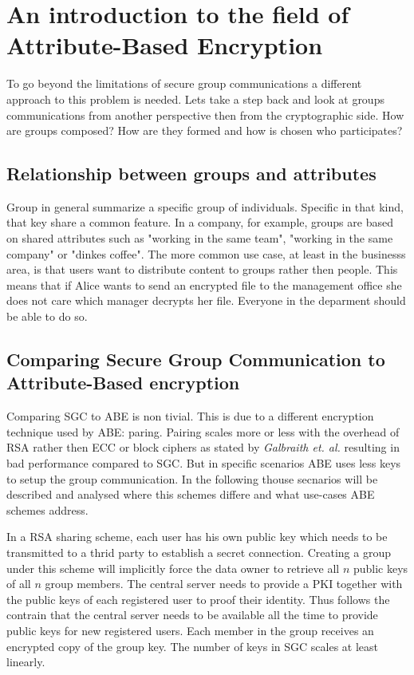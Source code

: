 \section{An introduction to the field of Attribute-Based Encryption}
To go beyond the limitations of secure group communications a different approach to this problem is needed. Lets take a step back and look at groups communications from another perspective then from the cryptographic side. How are groups composed? How are they formed and how is chosen who participates? 

\subsection{Relationship between groups and attributes}
Group in general summarize a specific group of individuals. Specific in that kind, that key share a common feature. In a company, for example, groups are based on shared attributes such as "working in the same team", "working in the same company" or "dinkes coffee". The more common use case, at least in the businesss area, is that users want to distribute content to groups rather then people. This means that if Alice wants to send an encrypted file to the management office she does not care which manager decrypts her file. Everyone in the deparment should be able to do so. 

\subsection{Comparing Secure Group Communication to Attribute-Based encryption}
Comparing SGC to ABE is non tivial. This is due to a different encryption technique used by ABE: paring. Pairing scales more or less with the overhead of RSA rather then ECC or block ciphers as stated by \textit{Galbraith et. al.} \cite{galbraith2008pairings} resulting in bad performance compared to SGC. But in specific scenarios ABE uses less keys to setup the group communication. In the following thouse secnarios will be described and analysed where this schemes differe and what use-cases ABE schemes address.

In a RSA sharing scheme, each user has his own public key which needs to be transmitted to a thrid party to establish a secret connection. Creating a group under this scheme will implicitly force the data owner to retrieve all $n$ public keys of all $n$ group members. The central server needs to provide a PKI together with the public keys of each registered user to proof their identity. Thus follows the contrain that the central server needs to be available all the time to provide public keys for new registered users. Each member in the group receives an encrypted copy of the group key. The number of keys in SGC scales at least linearly. 

